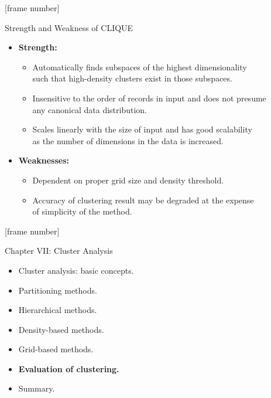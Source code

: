 \documentclass[aspectratio=169,t,xcolor=dvipsnames]{beamer}
\begin{document}
  {
    [frame number]
    \begin{frame}{Strength and Weakness of CLIQUE}
      \begin{itemize}
        \item \textbf{Strength:}
        \begin{itemize}
          \item Automatically finds subspaces of the highest dimensionality \\
          such that high-density clusters exist in those subspaces.
          \item Insensitive to the order of records in input and does not presume \\
          any canonical data distribution.
          \item Scales linearly with the size of input and has good scalability \\
          as the number of dimensions in the data is increased.
        \end{itemize}
        \item \textbf{Weaknesses:}
        \begin{itemize}
          \item Dependent on proper grid size and density threshold.
          \item Accuracy of clustering result may be degraded at the expense \\
          of simplicity of the method.
        \end{itemize}
      \end{itemize}
    \end{frame}
  }

  {
    [frame number]
    \begin{frame}{Chapter VII: Cluster Analysis}
        \begin{itemize}
            \item Cluster analysis: basic concepts.
            \item Partitioning methods.
            \item Hierarchical methods.
            \item Density-based methods.
            \item Grid-based methods.
            \item \textbf{Evaluation of clustering.}
            \item Summary.
        \end{itemize}
    \end{frame}
  }
\end{document}
